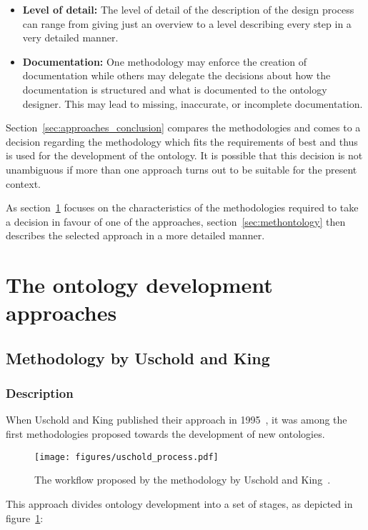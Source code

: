 \begin{itemize}
\begin{itemize}
      \item \textbf{Level of detail:} The level of detail of the description of the design process can range from giving just an overview to a level describing every step in a very detailed manner.

      \item \textbf{Documentation:} One methodology may enforce the creation of documentation while others may delegate the decisions about how the documentation is structured and what is documented to the ontology designer. This may lead to missing, inaccurate, or incomplete documentation.
    \end{itemize}
\end{itemize}

Section~\ref{sec:approaches_conclusion} compares the methodologies and comes to a decision regarding the methodology which fits the requirements of \smarthomeweather best and thus is used for the development of the ontology. It is possible that this decision is not unambiguous if more than one approach turns out to be suitable for the present context.

As section~\ref{sec:ontology_approaches} focuses on the characteristics of the methodologies required to take a decision in favour of one of the approaches, section~\ref{sec:methontology} then describes the selected approach in a more detailed manner.

\section{The ontology development approaches}
\label{sec:ontology_approaches}

\subsection{Methodology by Uschold and King}
\label{subsec:approach3}

\subsubsection{Description}

When Uschold and King published their approach in 1995~\cite{UscholdKing}, it was among the first methodologies proposed towards the development of new ontologies.

\begin{figure}
\centering
\texttt{[image: figures/uschold\_process.pdf]}
\caption{The workflow proposed by the methodology by Uschold and King~\cite{UscholdKing}.}
\label{fig:uschold_process}
\end{figure}
This approach divides ontology development into a set of stages, as depicted in figure~\ref{fig:uschold_process}:

